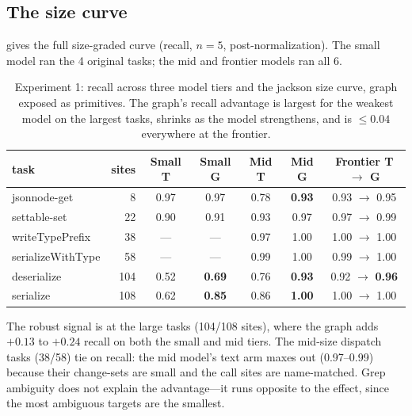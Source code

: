 \documentclass[11pt]{article}
\begin{document}
\subsection{The size curve}
\label{sec:curve}
 gives the full size-graded curve (recall, $n=5$,
post-normalization). The small model ran the 4 original tasks; the mid and
frontier models ran all 6.

\begin{table}[ht]
\centering
\small
\begin{tabular}{lrccccc}
\toprule
task & sites & Small T & Small G & Mid T & Mid G & Frontier T \(\to\) G \\
\midrule
jsonnode-get      & 8   & 0.97 & 0.97 & 0.78 & \textbf{0.93} & 0.93 \(\to\) 0.95 \\
settable-set      & 22  & 0.90 & 0.91 & 0.93 & 0.97          & 0.97 \(\to\) 0.99 \\
writeTypePrefix   & 38  & ---  & ---  & 0.97 & 1.00          & 1.00 \(\to\) 1.00 \\
serializeWithType & 58  & ---  & ---  & 0.99 & 1.00          & 0.99 \(\to\) 1.00 \\
deserialize       & 104 & 0.52 & \textbf{0.69} & 0.76 & \textbf{0.93} & 0.92 \(\to\) \textbf{0.96} \\
serialize         & 108 & 0.62 & \textbf{0.85} & 0.86 & \textbf{1.00} & 1.00 \(\to\) 1.00 \\
\bottomrule
\end{tabular}
\caption{Experiment 1: recall across three model tiers and the jackson size
curve, graph exposed as primitives. The graph's recall advantage is largest for
the weakest model on the largest tasks, shrinks as the model strengthens, and is
$\le 0.04$ everywhere at the frontier.}
\label{tab:curve}
\end{table}

The robust signal is at the large tasks (104/108 sites), where the graph adds
$+0.13$ to $+0.24$ recall on both the small and mid tiers. The mid-size dispatch
tasks (38/58) tie on recall: the mid model's text arm maxes out (0.97--0.99)
because their change-sets are small and the call sites are name-matched. Grep
ambiguity does not explain the advantage---it runs opposite to the effect,
since the most ambiguous targets are the smallest.
\end{document}
